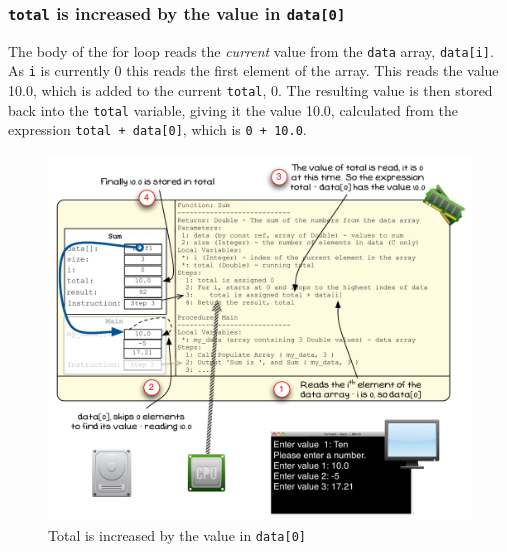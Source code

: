 
\clearpage
\subsubsection{\texttt{total} is increased by the value in \texttt{data[0]}} %
\label{ssub:total_is_incremented_by_the_value_in_data[0]}

The body of the for loop reads the \emph{current} value from the \texttt{data} array, \texttt{data[i]}. As \texttt{i} is currently 0 this reads the first element of the array. This reads the value 10.0, which is added to the current \texttt{total}, 0. The resulting value is then stored back into the \texttt{total} variable, giving it the value 10.0, calculated from the expression \texttt{total + data[0]}, which is \texttt{0 + 10.0}.

\begin{figure}[htbp]
   \centering
   \includegraphics[width=\textwidth]{./topics/arrays/images/Sum4} 
   \caption{Total is increased by the value in \texttt{data[0]}}
   \label{fig:sum-array-vis-4}
\end{figure}

